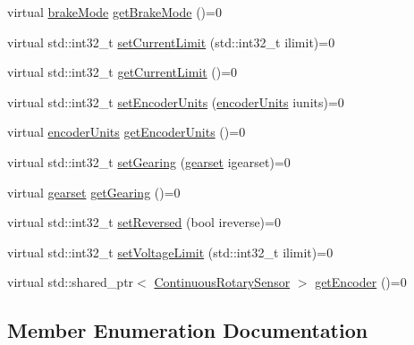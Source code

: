 \begin{DoxyCompactItemize}
\item 
virtual \mbox{\hyperlink{classokapi_1_1AbstractMotor_a132e0485dbb59a60c3f934338d8fa601}{brake\+Mode}} \mbox{\hyperlink{classokapi_1_1AbstractMotor_a157407c39c952a7c2eb497bddb868c93}{get\+Brake\+Mode}} ()=0
\item 
virtual std\+::int32\+\_\+t \mbox{\hyperlink{classokapi_1_1AbstractMotor_aec97c81f3d6604363ebc8ceaf425fe39}{set\+Current\+Limit}} (std\+::int32\+\_\+t ilimit)=0
\item 
virtual std\+::int32\+\_\+t \mbox{\hyperlink{classokapi_1_1AbstractMotor_ab83ef3319ffe1cb1d020e5a10127aab8}{get\+Current\+Limit}} ()=0
\item 
virtual std\+::int32\+\_\+t \mbox{\hyperlink{classokapi_1_1AbstractMotor_aae559b72399b0eb2124d969e40f97415}{set\+Encoder\+Units}} (\mbox{\hyperlink{classokapi_1_1AbstractMotor_ae811cd825099f2defadeb1b7f7e7764c}{encoder\+Units}} iunits)=0
\item 
virtual \mbox{\hyperlink{classokapi_1_1AbstractMotor_ae811cd825099f2defadeb1b7f7e7764c}{encoder\+Units}} \mbox{\hyperlink{classokapi_1_1AbstractMotor_ae8225381a81ca0b54469949a6022b775}{get\+Encoder\+Units}} ()=0
\item 
virtual std\+::int32\+\_\+t \mbox{\hyperlink{classokapi_1_1AbstractMotor_aba300f0e323cbdec60f1fee0f3197419}{set\+Gearing}} (\mbox{\hyperlink{classokapi_1_1AbstractMotor_a88aaa6ea2fa10f5520a537bbf26774d5}{gearset}} igearset)=0
\item 
virtual \mbox{\hyperlink{classokapi_1_1AbstractMotor_a88aaa6ea2fa10f5520a537bbf26774d5}{gearset}} \mbox{\hyperlink{classokapi_1_1AbstractMotor_adc90f1fc8af6c34c4e833355693474bb}{get\+Gearing}} ()=0
\item 
virtual std\+::int32\+\_\+t \mbox{\hyperlink{classokapi_1_1AbstractMotor_a72a6a4eb9d237ad57b92401b08ad64fa}{set\+Reversed}} (bool ireverse)=0
\item 
virtual std\+::int32\+\_\+t \mbox{\hyperlink{classokapi_1_1AbstractMotor_a2f33faf946b99cd34e9a591ccc33d644}{set\+Voltage\+Limit}} (std\+::int32\+\_\+t ilimit)=0
\item 
virtual std\+::shared\+\_\+ptr$<$ \mbox{\hyperlink{classokapi_1_1ContinuousRotarySensor}{Continuous\+Rotary\+Sensor}} $>$ \mbox{\hyperlink{classokapi_1_1AbstractMotor_a87177280c20a855a74354dd8ba6e1d6a}{get\+Encoder}} ()=0
\end{DoxyCompactItemize}


\subsection{Member Enumeration Documentation}
\mbox{\label{classokapi_1_1AbstractMotor_a132e0485dbb59a60c3f934338d8fa601}} 
